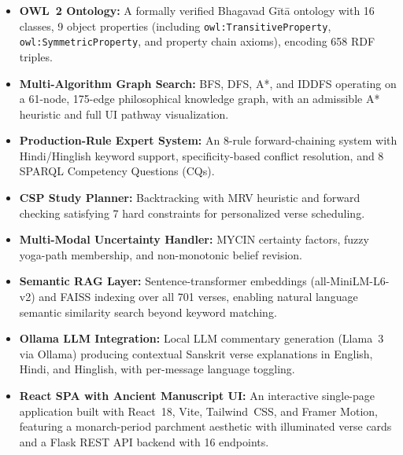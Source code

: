 \documentclass[conference]{IEEEtran}
\begin{document}
\begin{itemize}[leftmargin=*]
  \item \textbf{OWL~2 Ontology:} A formally verified Bhagavad G\={i}t\={a}
        ontology with 16 classes, 9 object properties (including
        \texttt{owl:TransitiveProperty}, \texttt{owl:SymmetricProperty},
        and property chain axioms), encoding 658 RDF triples.

  \item \textbf{Multi-Algorithm Graph Search:} BFS, DFS, A*, and IDDFS
        operating on a 61-node, 175-edge philosophical knowledge graph,
        with an admissible A* heuristic and full UI pathway visualization.

  \item \textbf{Production-Rule Expert System:} An 8-rule forward-chaining
        system with Hindi/Hinglish keyword support, specificity-based conflict
        resolution, and 8 SPARQL Competency Questions (CQs).

  \item \textbf{CSP Study Planner:} Backtracking with MRV heuristic and
        forward checking satisfying 7 hard constraints for personalized verse
        scheduling.

  \item \textbf{Multi-Modal Uncertainty Handler:} MYCIN certainty factors,
        fuzzy yoga-path membership, and non-monotonic belief revision.

  \item \textbf{Semantic RAG Layer:} Sentence-transformer embeddings (all-MiniLM-L6-v2)
        and FAISS indexing over all 701 verses, enabling natural language
        semantic similarity search beyond keyword matching.

  \item \textbf{Ollama LLM Integration:} Local LLM commentary generation
        (Llama~3 via Ollama) producing contextual Sanskrit verse explanations
        in English, Hindi, and Hinglish, with per-message language toggling.

  \item \textbf{React SPA with Ancient Manuscript UI:} An interactive
        single-page application built with React~18, Vite, Tailwind~CSS,
        and Framer Motion, featuring a monarch-period parchment aesthetic
        with illuminated verse cards and a Flask REST API backend with
        16 endpoints.
\end{itemize}

\end{document}
